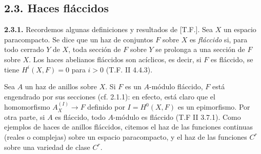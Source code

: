 \providecommand{\sisi}[2]{#2}

\subsection*{2.3. Haces fláccidos}

\textbf{2.3.1.} Recordemos algunas definiciones y resultados de [T.F.]. Sea $X$ un espacio paracompacto. Se dice que un haz de conjuntos $F$ sobre $X$ es \emph{fláccido} si, para todo cerrado $Y$ de $X$, toda sección de $F$ sobre $Y$ se prolonga a una sección de $F$ sobre $X$. Los haces abelianos fláccidos son acíclicos, es decir, si $F$ es fláccido, se tiene $H^i(X,F)=0$ para $i>0$ (T.F. II 4.4.3).

Sea $A$ un haz de anillos sobre $X$. Si $F$ es un $A$-módulo fláccido, $F$ está engendrado por sus secciones (cf. 2.1.1): en efecto, está claro que el homomorfismo $A_X^{(I)}\to F$ definido por $I=H^0(X,F)$ es un epimorfismo. Por otra parte, si $A$ es fláccido, todo $A$-módulo es fláccido (T.F II 3.7.1). Como ejemplos de haces de anillos fláccidos, citemos el haz de las funciones continuas (reales o complejas) sobre un espacio paracompacto, y el haz de las funciones $C^r$ sobre una variedad de clase $C^r$.

